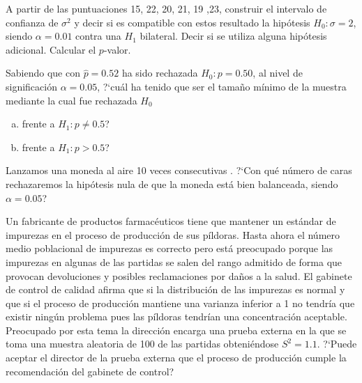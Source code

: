 \documentclass[12pt]{article}
\begin{document}
\begin{prob}
A partir de las puntuaciones 15, 22, 20, 21, 19 ,23, construir el intervalo de confianza de
$\sigma^2$ y decir si es compatible con estos resultado la hipótesis $H_{0}:\sigma=2$,
siendo $\alpha=0.01$ contra una $H_1$ bilateral. Decir si se utiliza alguna hipótesis adicional. Calcular el $p$-valor.
\end{prob}

\begin{prob}
    Sabiendo que con $\hat{p}=0.52$ ha sido rechazada $H_{0}:p=0.50$, al
    nivel de significación $\alpha=0.05$, ?`cuál ha tenido que ser el
    tamaño mínimo de la muestra mediante la cual fue rechazada
    $H_{0}$

    \begin{enumerate}[a)]
        \item frente a $H_{1}:p\not=0.5$?
    \item frente a $H_{1}:p>0.5$?
    \end{enumerate}

    \begin{prob}
        Lanzamos una moneda al aire 10 veces consecutivas . ?`Con qué número
        de caras rechazaremos la hipótesis nula de que la moneda está bien
        balanceada, siendo $\alpha=0.05$?
        \end{prob}
\end{prob}



\begin{prob}%
Un fabricante de productos farmacéuticos tiene que mantener un estándar de impurezas en el
proceso de producción de sus píldoras. Hasta ahora el número medio poblacional de impurezas
es correcto pero está preocupado porque las impurezas en algunas de las partidas se salen
del rango admitido de forma que provocan devoluciones y posibles reclamaciones por daños a
la salud. El gabinete de control de calidad afirma que si la distribución de las impurezas
es normal y que si el proceso de producción mantiene  una varianza inferior a 1 no tendría
que existir ningún problema pues las píldoras tendrían una concentración aceptable.
Preocupado por esta tema la dirección encarga una prueba externa en la que se toma una
muestra aleatoria de 100 de las partidas obteniéndose $S^2=1.1$. ?`Puede aceptar el director
de la prueba externa que el proceso de producción cumple la recomendación del gabinete de
control?
\end{prob}
\end{document}
